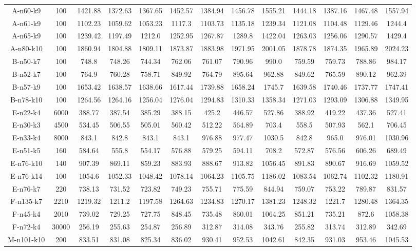 \documentclass[11pt]{article} %
\begin{document}
\begin{enumerate}
\begin{landscape}
\begin{table}[p]
\begin{small}
\begin{tabular}{ccccccccccccc}
A-n60-k9&100&1421.88&1372.63&1367.65&1452.57&1384.94&1456.78&1555.21&1444.18&1387.16&1467.48&1557.94 \\
A-n61-k9&100&1102.23&1059.62&1053.23&1117.3&1103.73&1135.18&1239.34&1121.08&1104.48&1129.46&1244.4 \\
A-n65-k9&100&1239.42&1197.49&1212.0&1252.95&1267.87&1289.8&1422.04&1263.03&1256.06&1290.57&1429.4 \\
A-n80-k10&100&1860.94&1804.88&1809.11&1873.87&1883.98&1971.95&2001.05&1878.78&1874.35&1965.89&2024.23 \\
B-n50-k7&100&748.8&748.26&744.34&762.06&761.07&790.96&990.0&759.59&759.73&788.86&984.17 \\
B-n52-k7&100&764.9&760.28&758.71&849.92&764.79&895.64&962.88&849.62&765.59&890.12&962.39 \\
B-n57-k9&100&1653.42&1638.57&1638.66&1617.44&1739.88&1658.24&1745.7&1639.58&1740.46&1737.77&1747.41 \\
B-n78-k10&100&1264.56&1264.16&1256.04&1276.04&1294.83&1310.33&1358.34&1271.03&1293.09&1306.88&1349.95 \\
E-n22-k4&6000&388.77&387.54&385.29&388.15&425.2&446.57&527.86&388.92&419.22&437.36&527.41 \\
E-n30-k3&4500&534.45&506.55&505.01&560.42&512.22&564.89&703.4&558.5&507.93&562.1&706.45 \\
E-n33-k4&8000&843.1&842.8&843.1&843.1&976.88&977.47&1030.5&842.8&965.0&976.01&1030.96 \\
E-n51-k5&160&584.64&555.8&554.17&576.88&579.25&594.11&708.2&572.87&576.56&606.26&689.49 \\
E-n76-k10&140&907.39&869.11&859.23&883.93&888.67&913.82&1056.45&891.83&890.67&916.69&1059.52 \\
E-n76-k14&100&1054.6&1052.33&1048.42&1078.14&1064.23&1105.75&1186.02&1083.54&1062.74&1102.32&1180.91 \\
E-n76-k7&220&738.13&731.52&723.82&749.23&755.71&775.59&844.94&759.07&753.22&789.87&831.57 \\
F-n135-k7&2210&1219.32&1211.2&1197.58&1264.63&1234.83&1270.17&1381.23&1248.32&1221.7&1280.48&1364.35 \\
F-n45-k4&2010&739.02&729.25&727.75&848.45&735.48&860.01&1064.25&851.21&735.21&872.6&1058.38 \\
F-n72-k4&30000&256.19&255.63&254.87&256.89&312.87&314.08&343.76&255.82&313.74&312.89&342.69 \\
M-n101-k10&200&833.51&831.08&825.34&836.02&930.41&952.53&1042.61&842.35&931.03&953.46&1045.53 \\

\end{tabular}
\end{small}
\end{table}
\end{landscape}
\end{enumerate}
\end{document}
